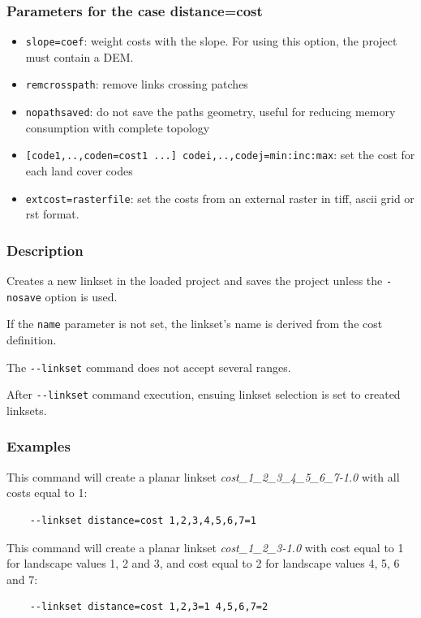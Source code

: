 \documentclass[a4paper,10pt]{report}
\begin{document}
\subsubsection{Parameters for the case distance=cost}
\begin{itemize}
	\item \verb|slope=coef|: weight costs with the slope. For using this option, the project must contain a DEM.
	\item \verb|remcrosspath|: remove links crossing patches
	\item \verb|nopathsaved|: do not save the paths geometry, useful for reducing memory consumption with complete topology
	\item \verb|[code1,..,coden=cost1 ...] codei,..,codej=min:inc:max|: set the cost for each land cover codes
	\item \verb|extcost=rasterfile|: set the costs from an external raster in tiff, ascii grid or rst format.
\end{itemize}

\subsubsection{Description}
Creates a new linkset in the loaded project and saves the project unless the \verb|-nosave| option is used. 

If the \verb|name| parameter is not set, the linkset's name is derived from the cost definition.

The \verb|--linkset| command does not accept several ranges.

After \verb|--linkset| command execution, ensuing linkset selection is set to created linksets.

\subsubsection{Examples}
This command will create a planar linkset \textit{cost\_1\_2\_3\_4\_5\_6\_7-1.0} with all costs equal to 1:
\begin{Verbatim}
	--linkset distance=cost 1,2,3,4,5,6,7=1
\end{Verbatim}

This command will create a planar linkset \textit{cost\_1\_2\_3-1.0} with cost equal to 1 for landscape values 1, 2 and 3, and cost equal to 2 for landscape values 4, 5, 6 and 7:
\begin{Verbatim}
	--linkset distance=cost 1,2,3=1 4,5,6,7=2
\end{Verbatim}
\end{document}
